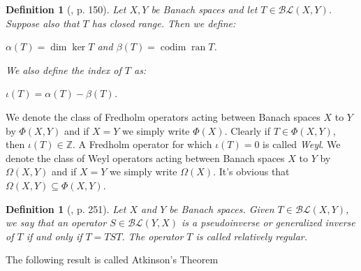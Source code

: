 \documentclass[12pt, oneside]{book}
\newtheorem{proposition}[theorem]{Proposition}
\newtheorem{definition}[theorem]{Definition}
\newcommand{\qed}{\hfill ~$\Box$\\}
\def\ker{\operatorname{ker}}
\def\ran{\operatorname{ran}}
\def\dim{\operatorname{dim}}
\def\codim{\operatorname{codim}}
\begin{document}
\begin{definition}[\cite{Muller}, p. 150]
\normalfont
\noindent Let $X, Y$ be Banach spaces and let $T \in \mathcal{BL}(X, Y)$. Suppose also that $T$ has 
closed range. Then we define:
\begin{center}
$\alpha(T) = \dim \ker T$ \qquad and \qquad $\beta (T) = \codim \ran T$. 
\end{center}
We also define  the {\sl index} of $T$ as:
\begin{center}
$\iota (T) = \alpha(T) - \beta(T)$.
\end{center}
\end{definition}

\noindent We denote the class of Fredholm operators acting between Banach spaces $X$ to $Y$ by 
$\Phi(X,Y)$
and if $X=Y$ we simply write $\Phi(X)$. Clearly if $T \in \Phi(X,Y)$, then $\iota (T) \in \mathbb{Z}$. 
A Fredholm operator for which $\iota(T)=0$ is called {\sl Weyl}. 
We denote the class of Weyl operators acting between Banach spaces $X$ to $Y$ by $\Omega(X,Y)$ and if $X=Y$ we simply write $\Omega(X)$. It's obvious that $\Omega(X, Y)  \subseteq  \Phi(X, Y).$


\begin{definition}[\cite{TL}, p. 251]
\normalfont
\noindent Let $X$ and $Y$ be Banach spaces. Given $T \in \mathcal{BL}(X,Y)$, we say that an operator 
$S \in \mathcal{BL}(Y,X)$ is a pseudoinverse or generalized inverse of $T$ if and only if $T=TST$. 
The operator $T$ is called relatively regular.

\end{definition}

\noindent The following result is called Atkinson's Theorem
\end{document}
